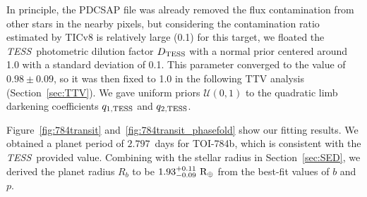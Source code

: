 \documentclass[twocolumn]{aastex631}
\newcommand{\tess}{\textit{TESS}\ }
\begin{document}
In principle, the PDCSAP file was already removed the flux contamination from other stars in the nearby pixels, but considering the contamination ratio estimated by TICv8 is relatively large (0.1) for this target, we floated the \tess photometric dilution factor $D_{\rm{TESS}}$ with a normal prior centered around 1.0 with a standard deviation of 0.1. This parameter converged to the value of $0.98\pm0.09$, so it was then fixed to 1.0 in the following TTV analysis (Section~\ref{sec:TTV}). We gave uniform priors $\mathcal{U}(0,1)$ to the quadratic limb darkening coefficients $q_{1,\rm{TESS}}$ and $q_{2,\rm{TESS}}$. 

Figure~\ref{fig:784transit} and~\ref{fig:784transit_phasefold} show our fitting results. We obtained a planet period of $2.797$~days for TOI-784b, which is consistent with the \tess provided value. Combining with the stellar radius in Section~\ref{sec:SED}, we derived the planet radius $R_b$ to be $1.93^{+0.11}_{-0.09}\ \rm{R_{\oplus}}$ from the best-fit values of $b$ and $p$. 
\end{document}
